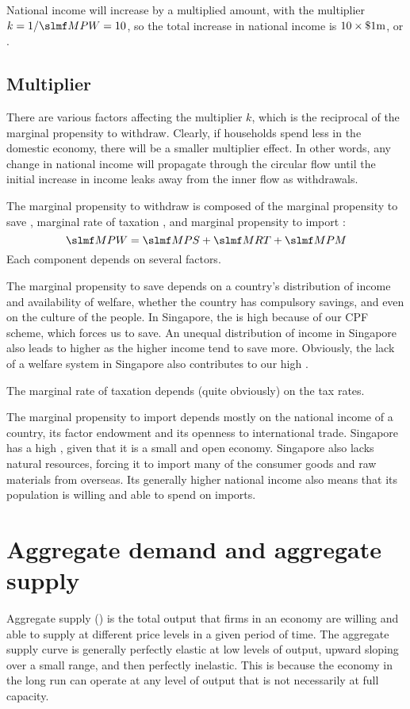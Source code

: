 \documentclass[Economics.tex]{subfiles}
\begin{document}
National income will increase by a multiplied amount, with the multiplier \(k = 1/\MPW = 10\), so the total increase in national income is \(10 \times \dol[m]{1}\), or .
\subsection{Multiplier}
There are various factors affecting the multiplier \(k\), which is the reciprocal of the marginal propensity to withdraw. Clearly, if households spend less in the domestic economy, there will be a smaller multiplier effect. In other words, any change in national income will propagate through the circular flow until the initial increase in income leaks away from the inner flow as withdrawals.

The marginal propensity to withdraw is composed of the marginal propensity to save \MPS{}, marginal rate of taxation \MRT{}, and marginal propensity to import \MPM{}: \[\MPW = \MPS + \MRT + \MPM\] Each component depends on several factors.

The marginal propensity to save depends on a country's distribution of income and availability of welfare, whether the country has compulsory savings, and even on the culture of the people. In Singapore, the \MPS{} is high because of our CPF scheme, which forces us to save. An unequal distribution of income in Singapore also leads to higher \MPS{} as the higher income tend to save more. Obviously, the lack of a welfare system in Singapore also contributes to our high \MPS{}.

The marginal rate of taxation depends (quite obviously) on the tax rates.

The marginal propensity to import depends mostly on the national income of a country, its factor endowment and its openness to international trade. Singapore has a high \MPM{}, given that it is a small and open economy. Singapore also lacks natural resources, forcing it to import many of the consumer goods and raw materials from overseas. Its generally higher national income also means that its population is willing and able to spend on imports.
\section{Aggregate demand and aggregate supply}
Aggregate supply (\AS{}) is the total output that firms in an economy are willing and able to supply at different price levels in a given period of time. The aggregate supply curve is generally perfectly elastic at low levels of output, upward sloping over a small range, and then perfectly inelastic. This is because the economy in the long run can operate at any level of output that is not necessarily at full capacity.
\end{document}
